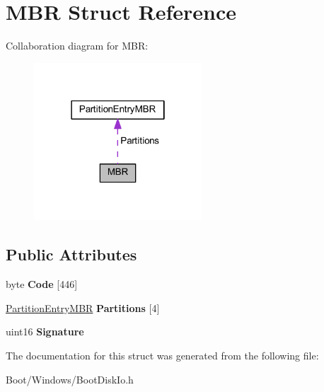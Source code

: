 \hypertarget{struct_m_b_r}{}\section{M\+BR Struct Reference}
\label{struct_m_b_r}


Collaboration diagram for M\+BR\+:
\nopagebreak
\begin{figure}[H]
\begin{center}
\leavevmode
\includegraphics[width=178pt]{struct_m_b_r__coll__graph}
\end{center}
\end{figure}
\subsection*{Public Attributes}
\begin{DoxyCompactItemize}
\item 
\mbox{\label{struct_m_b_r_a676381edfcf6a60b1a2ad4c1c2617903}} 
byte {\bfseries Code} \mbox{[}446\mbox{]}
\item 
\mbox{\label{struct_m_b_r_af2281ac39bce3d6d7205744966b0602f}} 
\hyperlink{struct_partition_entry_m_b_r}{Partition\+Entry\+M\+BR} {\bfseries Partitions} \mbox{[}4\mbox{]}
\item 
\mbox{\label{struct_m_b_r_a6c175e2121f63e4599173aaed01706e7}} 
uint16 {\bfseries Signature}
\end{DoxyCompactItemize}


The documentation for this struct was generated from the following file\+:\begin{DoxyCompactItemize}
\item 
Boot/\+Windows/Boot\+Disk\+Io.\+h\end{DoxyCompactItemize}
